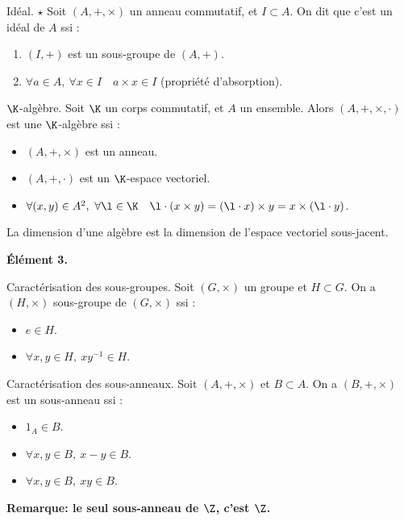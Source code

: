 \documentclass[11pt]{article}
\begin{document}
\begin{defi}{Idéal. $\star$}{}
    Soit $(A,+,\times)$ un anneau commutatif, et $I\subset A$. On dit que c'est un idéal de $A$ ssi :
    \begin{enumerate}
        \item $(I,+)$ est un sous-groupe de $(A,+)$.
        \item $\forall a \in A, ~ \forall x \in I \quad a\times x \in I$ (propriété d'absorption).
    \end{enumerate}
\end{defi}

\begin{defi}{$\K$-algèbre.}{}
    Soit $\K$ un corps commutatif, et $A$ un ensemble. Alors $(A,+,\times,\cdot)$ est une $\K$-algèbre ssi :
    \begin{itemize}
        \item $(A,+,\times)$ est un anneau.
        \item $(A,+,\cdot)$ est un $\K$-espace vectoriel.
        \item $\forall (x,y)\in A^2, ~ \forall \l \in \K \quad \l\cdot(x\times y)=(\l\cdot x) \times y=x\times(\l\cdot y)$.
    \end{itemize}
    La dimension d'une algèbre est la dimension de l'espace vectoriel sous-jacent.
\end{defi}

\bf{Élément 3.}

\begin{prop}{Caractérisation des sous-groupes.}{}
    Soit $(G,\times)$ un groupe et $H\subset G$. On a $(H,\times)$ sous-groupe de $(G,\times)$ ssi :
    \begin{itemize}
        \item $e\in H$.
        \item $\forall x,y \in H, ~ xy^{-1}\in H$.
    \end{itemize}
\end{prop}

\begin{rappel}{Caractérisation des sous-anneaux.}{}
    Soit $(A,+,\times)$ et $B\subset A$. On a $(B,+,\times)$ est un sous-anneau ssi :
    \begin{itemize}
        \item $1_A\in B$.
        \item $\forall x,y \in B, ~ x-y\in B$.
        \item $\forall x,y \in B, ~ xy\in B$.
    \end{itemize}
    \bf{Remarque:} le seul sous-anneau de $\Z$, c'est $\Z$.
\end{rappel}
\end{document}
